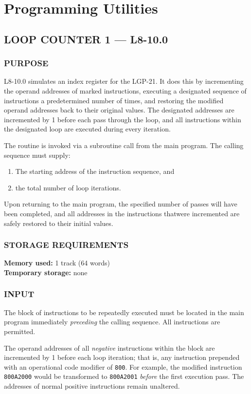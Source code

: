 \section{Programming Utilities}
\subsection*{LOOP COUNTER 1 --- L8-10.0}

\subsubsection*{PURPOSE}
L8-10.0 simulates an index register for the LGP-21. It does this by incrementing the operand addresses of marked instructions, executing a designated sequence of instructions a predetermined number of times, and restoring the modified operand addresses back to their original values. The designated addresses are incremented by 1 before each pass through the loop, and all instructions within the designated loop are executed during every iteration.

The routine is invoked via a subroutine call from the main program. The calling sequence must supply:
\begin{enumerate}
	\item The starting address of the instruction sequence, and
	\item the total number of loop iterations. 
\end{enumerate}
\noindent Upon returning to the main program, the specified number of passes will have been completed, and all addresses in the instructions thatwere incremented are safely restored to their initial values.

\subsubsection*{STORAGE REQUIREMENTS}
\textbf{Memory used:} 1 track (64 words) \\
\textbf{Temporary storage:} none

\subsubsection*{INPUT}
The block of instructions to be repeatedly executed must be located in the main program immediately \emph{preceding} the calling sequence. All instructions are permitted.

The operand addresses of all \emph{negative} instructions within the block are incremented by 1 before each loop iteration; that is, any instruction prepended with an operational code modifier of \texttt{800}. For example, the modified instruction \texttt{800A2000} would be transformed to \texttt{800A2001} \emph{before} the first execution pass. The addresses of normal positive instructions remain unaltered.

